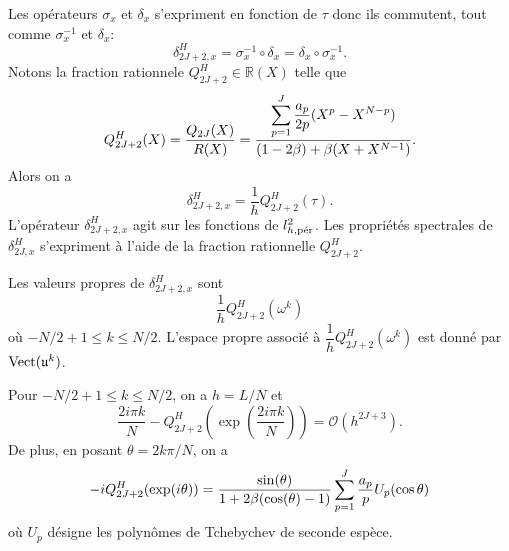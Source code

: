 Les opérateurs $\sigma_x$ et $\delta_{x}$ s’expriment en fonction de $\tau$ donc ils commutent, tout comme $\sigma_x^{-1}$ et $\delta_{x}$:
\begin{equation}
\delta_{2J+2,x}^H = \sigma_x^{-1} \circ \delta_{x} = \delta_{x} \circ \sigma_x^{-1}.
\end{equation}
Notons la fraction rationnele $Q_{2J+2}^H \in \mathbb{R}(X)$ telle que 
\begin{equation}
Q_{2J+2}^H(X) = \dfrac{Q_{2J}(X)}{R(X)} = \dfrac{\gsum_{p=1}^J \dfrac{a_p}{2p} (X^p - X^{N-p})}{(1-2\beta) + \beta ( X + X^{N-1})}.
\label{eq:pol_hermitien}
\end{equation}
Alors on a 
\begin{equation}
\delta_{2J+2,x}^H = \dfrac{1}{h} Q_{2J+2}^H(\tau).
\end{equation}
L'opérateur $\delta_{2J+2,x}^H$ agit sur les fonctions de $l^2_{h,\per}$. Les propriétés spectrales de $\delta_{2J,x}^H$ s'expriment à l'aide de la fraction rationnelle $Q_{2J+2}^H$.

\begin{proposition}
Les valeurs propres de $\delta_{2J+2,x}^H$ sont 
\begin{equation}
\dfrac{1}{h} Q_{2J+2}^H (\omega^k)
\end{equation}
où $-N/2+1 \leq k \leq N/2$. L'espace propre associé à $\dfrac{1}{h} Q_{2J+2}^H (\omega^k)$ est donné par $\Vect( \mathfrak{u}^k )$.
\label{prop:eigen_mat_hermitien}
\end{proposition}

\begin{proposition}
Pour $-N/2+1  \leq k \leq N/2$, on a $h=L/N$ et 
\begin{equation}
\dfrac{2 i \pi k}{N} - Q_{2J+2}^H \left( \exp \left( \dfrac{2 i \pi k}{N} \right) \right) = \mathcal{O}(h^{2J+3}).
\end{equation}
De plus, en posant $\theta = 2 k \pi / N$, on a
\begin{equation}
- i Q_{2J+2}^H(\exp (i \theta) ) = \dfrac{\sin(\theta)}{1 +2 \beta (\cos (\theta) -1)} \gsum_{p=1}^J \dfrac{a_p}{p} U_p (\cos \theta ) 
\end{equation}
où $U_p$ désigne les polynômes de Tchebychev de seconde espèce.
\label{prop:hermitien_polynome}
\end{proposition}

